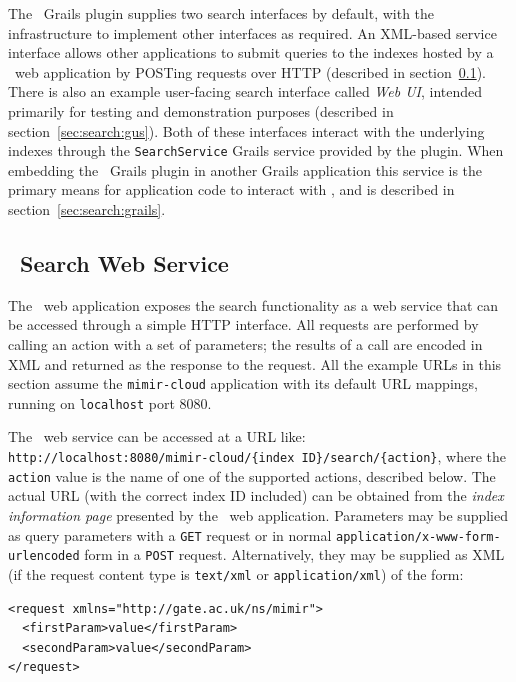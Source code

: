 The \Mimir\ Grails plugin supplies two search interfaces by default, with the
infrastructure to implement other interfaces as required.  An XML-based service
interface allows other applications to submit queries to the indexes hosted by
a \Mimir\ web application by POSTing requests over HTTP (described in
section~\ref{sec:search:service}).  There is also an example user-facing search
interface called {\em Web UI}, intended primarily for testing and demonstration
purposes (described in section~\ref{sec:search:gus}).  Both of these interfaces
interact with the underlying indexes through the {\tt SearchService} Grails
service provided by the plugin.  When embedding the \Mimir\ Grails plugin in
another Grails application this service is the primary means for application
code to interact with \Mimir, and is described in
section~\ref{sec:search:grails}.

\subsection{\Mimir\ Search Web Service}\label{sec:search:service}

The \Mimir\ web application exposes the search functionality as a web service
that can be accessed through a simple HTTP interface. All requests are performed
by calling an action with a set of parameters; the results of a call are encoded
in XML and returned as the response to the request.  All the example URLs in
this section assume the {\tt mimir-cloud} application with its
default URL mappings, running on {\tt localhost} port 8080.

The \Mimir\ web service can be accessed at a URL like:\\
{\tt http://localhost:8080/mimir-cloud/\{index ID\}/search/\{action\}},
where the {\tt action} value is the name of one of the supported actions,
described below. The actual URL (with the correct index ID included) can be
obtained from the {\em index information page} presented by  the \Mimir\ web
application.  Parameters may be supplied as query parameters with a {\tt GET}
request or in normal {\tt application/x-www-form-urlencoded} form in a
{\tt POST} request.  Alternatively, they may be supplied as XML (if the request
content type is {\tt text/xml} or {\tt application/xml}) of the form:
\begin{verbatim}
<request xmlns="http://gate.ac.uk/ns/mimir">
  <firstParam>value</firstParam>
  <secondParam>value</secondParam>
</request>
\end{verbatim}

